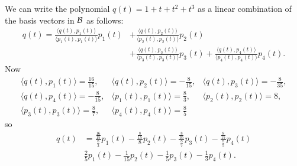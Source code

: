 \begin{example}
\item  We can write the polynomial $q(t) = 1+t+t^2+t^3$ as a linear combination of the basis vectors in $\mathcal{B}$ as follows:
\begin{align*}
q(t) = \frac{\langle q(t),p_1(t) \rangle }{\langle p_1(t),p_1(t) \rangle} p_1(t) &+ \frac{\langle q(t),p_2(t) \rangle }{\langle p_2(t),p_2(t) \rangle} p_2(t) \\
	&+ \frac{\langle q(t),p_3(t) \rangle }{\langle p_3(t),p_3(t) \rangle} p_3(t) + \frac{\langle q(t),p_4(t) \rangle }{\langle p_4(t),p_4(t) \rangle} p_4(t).
\end{align*}
Now 
\[\begin{array}{ccc}
\langle q(t), p_1(t) \rangle = \frac{16}{15}, &\langle q(t), p_2(t) \rangle = -\frac{8}{15}, &\langle q(t), p_3(t) \rangle = -\frac{8}{35}, \\
\langle q(t), p_4(t) \rangle = -\frac{8}{15}, &\langle p_1(t), p_1(t)\rangle  = \frac{8}{3}, &\langle p_2(t), p_2(t) \rangle = 8, \\
\langle p_3(t), p_3(t) \rangle = \frac{8}{7}, &\langle p_4(t), p_4(t) \rangle = \frac{8}{5} & 
\end{array}\]
so
\begin{align*}
q(t) &= \frac{ \frac{16}{15} }{ \frac{8}{3} } p_1(t) - \frac{ \frac{8}{15} }{ 8 } p_2(t) -  \frac{ \frac{8}{35} }{ \frac{8}{7} } p_3(t) -  \frac{ \frac{8}{15} }{ \frac{8}{5} } p_4(t) \\
	&\frac{2}{5} p_1(t) - \frac{1}{15}p_2(t) - \frac{1}{5} p_3(t) - \frac{1}{3} p_4(t).
\end{align*}

\ea

\end{example}


